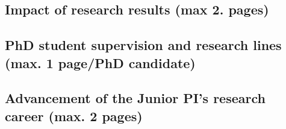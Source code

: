 \subsection{Impact of research results (max 2. pages)}

\subsection{PhD student supervision and research lines (max. 1 page/PhD candidate)}

\subsection{Advancement of the Junior PI’s research career (max. 2 pages)}


